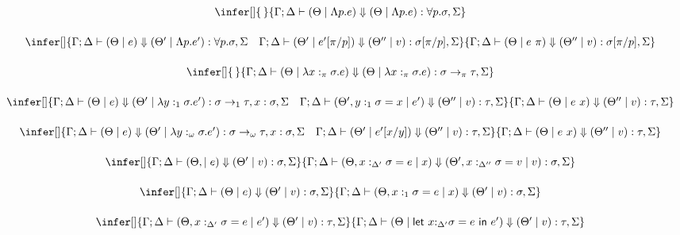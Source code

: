 \documentclass[acmsmall,review,anonymous,screen]{acmart}
\newcommand{\llet}[2]{\mathsf{let}~#1~\mathsf{in}~#2}
\begin{document}
\[
  \begin{array}{c}
    \infer[]
    {\,}
    {\Gamma;\Delta \vdash (\Theta \mid \Lambda p.e) \Downarrow (\Theta \mid
    \Lambda p.e) : \forall p . \sigma , \Sigma }
    \\[1.5em]
    \infer[]
    {\Gamma ; \Delta \vdash (\Theta \mid  e) \Downarrow (\Theta' \mid
    \Lambda p.e') : \forall p . \sigma , \Sigma \quad \Gamma ;\Delta \vdash
      (\Theta' \mid e'[\pi/p]) \Downarrow (\Theta'' \mid v) : \sigma[\pi/p], \Sigma}
    {\Gamma ; \Delta \vdash (\Theta \mid e~\pi) \Downarrow (\Theta''
      \mid v) : \sigma[\pi/p] , \Sigma  }\\[1.5em]
    \infer[]
    {\,}
    {\Gamma ;\Delta \vdash (\Theta \mid \lambda x:_\pi \sigma . e)
    \Downarrow (\Theta \mid \lambda x:_\pi\sigma .e) : \sigma
    \rightarrow_\pi \tau,\Sigma }\\[1.5em]
    \infer[]
    {\Gamma;\Delta \vdash  (\Theta \mid e) \Downarrow (\Theta' \mid
    \lambda y:_1 \sigma . e') : \sigma \rightarrow_1 \tau , x:\sigma, \Sigma
    \quad
    \Gamma ; \Delta \vdash (\Theta' , y:_{1} \sigma = x \mid e') \Downarrow (\Theta''
    \mid v) : \tau , \Sigma  }
    {\Gamma ; \Delta\vdash (\Theta \mid  e~x ) \Downarrow (\Theta''
    \mid v) : \tau , \Sigma }\\[1.5em]
        \infer[]
    {\Gamma;\Delta \vdash  (\Theta \mid e) \Downarrow (\Theta' \mid
    \lambda y:_\omega \sigma . e') : \sigma \rightarrow_\omega \tau , x:\sigma, \Sigma
    \quad
            \Gamma ; \Delta \vdash (\Theta' \mid e'[x/y]) \Downarrow (\Theta''
    \mid v) : \tau , \Sigma  }
    {\Gamma ; \Delta\vdash (\Theta \mid  e~x ) \Downarrow (\Theta''
    \mid v) : \tau , \Sigma }\\[1.5em]
       \infer[]
    {\Gamma ; \Delta  \vdash (\Theta,  \mid e)
    \Downarrow (\Theta' \mid v) : \sigma , \Sigma}
    {\Gamma ; \Delta \vdash (\Theta , x:_{\Delta'} \sigma = e \mid x)
      \Downarrow (\Theta' , x:_{\Delta''} \sigma = v \mid v) : \sigma, \Sigma}
    \\[1.5em]
           \infer[]
    {\Gamma ;\Delta  \vdash (\Theta \mid e)
    \Downarrow (\Theta' \mid v) : \sigma,\Sigma}
    {\Gamma ; \Delta \vdash (\Theta , x:_1 \sigma = e \mid x)
    \Downarrow (\Theta' \mid v) : \sigma,\Sigma}
    \\[1.5em]
    
    \infer[]
    {\Gamma ;\Delta \vdash (\Theta,x:_{\Delta'} \sigma = e \mid e')
    \Downarrow (\Theta' \mid v) : \tau,\Sigma}
    {\Gamma ; \Delta \vdash (\Theta \mid \llet{x{:}_{\Delta'}\sigma =
    e}{e'})\Downarrow (\Theta' \mid v) : \tau , \Sigma
    }\\[1.5em]
    

\end{array}\]
\end{document}
